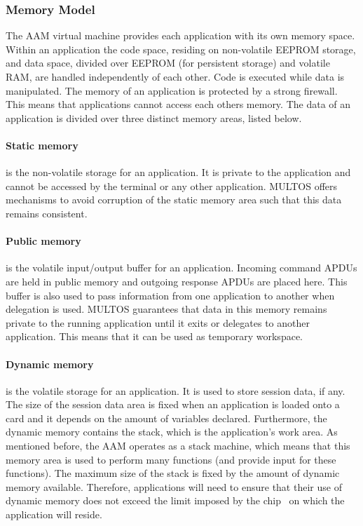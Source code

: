 \subsubsection{Memory Model}

The AAM virtual machine provides each application with its own memory space.
Within an application the code space, residing on non-volatile EEPROM storage,
and data space, divided over EEPROM (for persistent storage) and volatile RAM,
are handled independently of each other. Code is executed while data is
manipulated. The memory of an application is protected by a strong firewall.
This means that applications cannot access each others memory. The data of
an
application is divided over three distinct memory areas, listed below.

\paragraph{Static memory} is the non-volatile storage for an application. It is
private to the application and cannot be accessed by the terminal or any other
application. MULTOS offers mechanisms to avoid corruption of the static memory
area such that this data remains consistent.

\paragraph{Public memory} is the volatile input/output buffer for an
application. Incoming command APDUs are held in public memory and outgoing
response APDUs are placed here. This buffer is also used to pass information
from one application to another when delegation is used. MULTOS guarantees that
data in this memory remains private to the running application until it exits
or delegates to another application. This means that it can be used as
temporary workspace.

\paragraph{Dynamic memory} is the volatile storage for an application. It is
used to store session data, if any. The size of the session data area is fixed
when an application is loaded onto a card and it depends on the amount of
variables declared. Furthermore, the dynamic memory contains the stack, which
is the application's work area. As mentioned before, the AAM operates as a
stack machine, which means that this memory area is used to perform many
functions (and provide input for these functions). The maximum size of the
stack is fixed by the amount of dynamic memory available. Therefore,
applications will need to ensure that their use of dynamic memory does not
exceed the limit imposed by the chip~\cite{MIR2012} on which the application
will reside.

